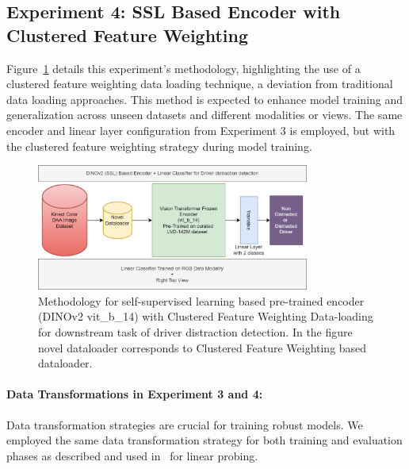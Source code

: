 \subsection{Experiment 4: SSL Based Encoder with Clustered Feature Weighting}
\label{section: Methodology Experiment 4: Self-Supervised Learning Based Encoder with Clustered Feature Weighting Data-loading}
Figure~\ref{fig:method_flow_chart_d_b_ssl} details this experiment's methodology, highlighting the use of a clustered feature weighting data loading technique, a deviation from traditional data loading approaches. This method is expected to enhance model training and generalization across unseen datasets and different modalities or views. The same encoder and linear layer configuration from Experiment 3 is employed, but with the clustered feature weighting strategy during model training.
\begin{figure}[h]
\begin{center}
\includegraphics[width=0.8\textwidth]{Images_Thesis/methodology_images/methodology_flowchart_d_b_ssl.png}
\end{center}
\caption[Methodology for self-supervised learning based pre-trained encoder with Clustered Feature Weighting Data-loading for downstream task of driver distraction detection.]{Methodology for self-supervised learning based pre-trained encoder (DINOv2 vit\_b\_14) with Clustered Feature Weighting Data-loading for downstream task of driver distraction detection. In the figure novel dataloader corresponds to Clustered Feature Weighting based dataloader.}
\label{fig:method_flow_chart_d_b_ssl}
\end{figure}

\paragraph{Data Transformations in Experiment 3 and 4:}
Data transformation strategies are crucial for training robust models. We employed the same data transformation strategy for both training and evaluation phases as described and used in~\citep{dinov2_oquab2023dinov2} for linear probing.
